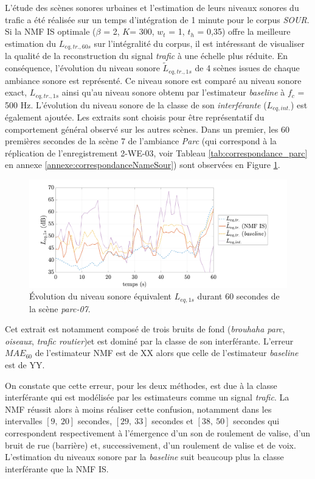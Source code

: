 L'étude des scènes sonores urbaines et l'estimation de leurs niveaux sonores du trafic a été réalisée sur un temps d'intégration de 1 minute pour le corpus \textit{SOUR}. 
Si la NMF IS optimale ($\beta$ = 2, $K$= 300, $w_t$ = 1, $t_h$ = 0,35) offre la meilleure estimation du $L_{eq,tr.,60s}$ sur l'intégralité du corpus, il est intéressant de visualiser la qualité de la reconstruction du signal \textit{trafic} à une échelle plus réduite. En conséquence, l'évolution du niveau sonore $\tilde{L}_{eq,tr.,1s}$ de 4 scènes issues de chaque ambiance sonore est représenté. Ce niveau sonore est comparé au niveau sonore exact, $L_{eq,tr.,1s}$ ainsi qu'au niveau sonore obtenu par l'estimateur \textit{baseline} à $f_c$ = 500 Hz. L'évolution du niveau sonore de la classe de son \textit{interférante} ($L_{eq,int.}$) est également ajoutée. Les extraits sont choisis pour être représentatif du comportement général observé sur les autres scènes.
Dans un premier, les 60 premières secondes de la scène 7 de l'ambiance \textit{Parc} (qui correspond à la réplication de l'enregistrement 2-WE-03, voir Tableau \ref{tab:correspondance_parc} en annexe \ref{annexe:correspondanceNameSour}) sont observées en Figure \ref{fig:Lp_parc}.


\begin{figure}[h!]
\centering
\includegraphics[width=.8\linewidth]{./figures/NMF/Lp_park_7.pdf} 
\caption{Évolution du niveau sonore équivalent $L_{eq, 1s}$ durant 60 secondes de la scène \textit{parc-07}.} 
\label{fig:Lp_parc}
\end{figure}

Cet extrait est notamment composé de trois bruits de fond (\textit{brouhaha parc}, \textit{oiseaux}, \textit{trafic routier})et est dominé par la classe de son interférante. 
L'erreur $MAE_{60}$ de l'estimateur NMF est de XX alors que celle de l'estimateur \textit{baseline} est de YY. 

On constate que cette erreur, pour les deux méthodes, est due à la classe interférante qui est modélisée par les estimateurs comme un signal \textit{trafic}. La NMF réussit alors à moins réaliser cette confusion, notamment dans les intervalles $\left[ 9,~20 \right]$ secondes, $\left[ 29,~33 \right]$ secondes et $\left[ 38,~50 \right]$ secondes qui correspondent respectivement à l'émergence d'un son de roulement de valise, d'un bruit de rue (barrière) et, successivement, d'un roulement de valise et de voix. L'estimation du niveaux sonore par la \textit{baseline} suit beaucoup plus la classe interférante que la NMF IS. 

